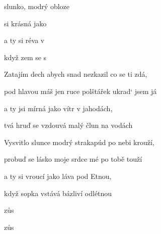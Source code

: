 

  

\zs
{} slunko, modrý   obloze   

 si krásná jako   

a ty si   réva v 

když zem se  s  
\ks

\zs
{Zatajím} dech abych snad {nezkazil} {co} se ti {zdá,}

{pod} hlavou máš jen ruce {polštářek} {ukrad‘} jsem {já}

a ty jsi {mírná} {jako} vítr v {jahodách,}

tvá hruď se {vzdouvá} {malý} člun {na} vodách
\ks

\zs
{Vysvitlo} slunce modrý {strakapúd} {po} nebi {krouží,}

{probuď} se lásko moje {srdce} mé {po} tobě {touží}

a ty si {vroucí} {jako} láva {pod} Etnou,

když sopka {vstává} {bázliví} {odlétnou}
\ks

  zůs

  zůs

  

\kp





